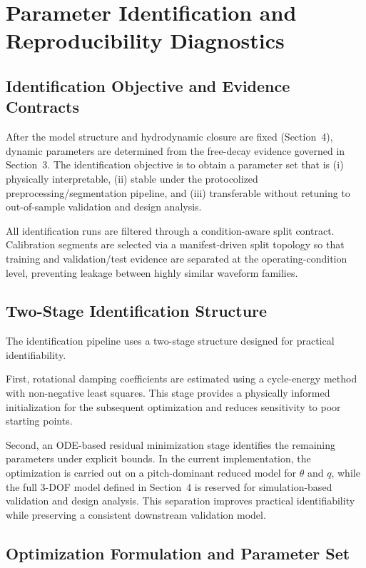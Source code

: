 \section{Parameter Identification and Reproducibility Diagnostics}

\subsection{Identification Objective and Evidence Contracts}

After the model structure and hydrodynamic closure are fixed (Section~4), dynamic parameters are determined from the free-decay evidence governed in Section~3. The identification objective is to obtain a parameter set that is (i) physically interpretable, (ii) stable under the protocolized preprocessing/segmentation pipeline, and (iii) transferable without retuning to out-of-sample validation and design analysis.

All identification runs are filtered through a condition-aware split contract. Calibration segments are selected via a manifest-driven split topology so that training and validation/test evidence are separated at the operating-condition level, preventing leakage between highly similar waveform families.

\subsection{Two-Stage Identification Structure}

The identification pipeline uses a two-stage structure designed for practical identifiability.

First, rotational damping coefficients are estimated using a cycle-energy method with non-negative least squares. This stage provides a physically informed initialization for the subsequent optimization and reduces sensitivity to poor starting points.

Second, an ODE-based residual minimization stage identifies the remaining parameters under explicit bounds. In the current implementation, the optimization is carried out on a pitch-dominant reduced model for $\theta$ and $q$, while the full 3-DOF model defined in Section~4 is reserved for simulation-based validation and design analysis. This separation improves practical identifiability while preserving a consistent downstream validation model.

\subsection{Optimization Formulation and Parameter Set}


